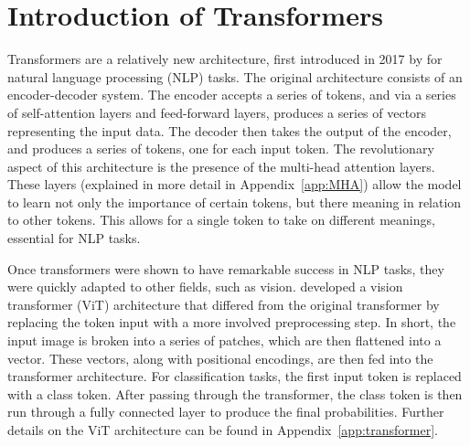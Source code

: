 \section{Introduction of Transformers}
\label{sec:transformers}
Transformers are a relatively new architecture, first introduced in 2017 by \textcite{vaswani2017}
for natural language processing (NLP) tasks. The original architecture consists of 
an encoder-decoder system. The encoder accepts a series of tokens, and via a series 
of self-attention layers and feed-forward layers, produces a series of vectors
representing the input data. The decoder then takes the output of the encoder, and
produces a series of tokens, one for each input token. The revolutionary aspect 
of this architecture is the presence of the multi-head attention layers. These layers 
(explained in more detail in Appendix~\ref{app:MHA}) allow the model to 
learn not only the importance of certain tokens, but there meaning in relation to 
other tokens. This allows for a single token to take on different meanings, essential 
for NLP tasks. 

Once transformers were shown to have remarkable success in NLP tasks, they were 
quickly adapted to other fields, such as vision. \textcite{dosovitskiy2020} developed 
a vision transformer (ViT) architecture that differed from the original transformer 
by replacing the token input with a more involved preprocessing step. In short, 
the input image is broken into a series of patches, which are then flattened into
a vector. These vectors, along with positional encodings, are then fed into the
transformer architecture. For classification tasks, the first input token is 
replaced with a class token. After passing through the transformer, the class token 
is then run through a fully connected layer to produce the final probabilities. 
Further details on the ViT architecture can be found in Appendix~\ref{app:transformer}.

